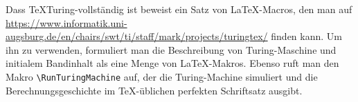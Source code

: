 Dass \TeX Turing-vollständig ist beweist ein Satz von \LaTeX-Macros, den
man auf
\url{https://www.informatik.uni-augsburg.de/en/chairs/swt/ti/staff/mark/projects/turingtex/}
finden kann.
Um ihn zu verwenden, formuliert man die Beschreibung
von Turing-Maschine und initialem Bandinhalt als eine Menge von
\LaTeX-Makros. Ebenso ruft man den Makro \verb+\RunTuringMachine+ auf,
der die Turing-Machine simuliert und die Berechnungsgeschichte im
\TeX-üblichen perfekten Schriftsatz ausgibt.



